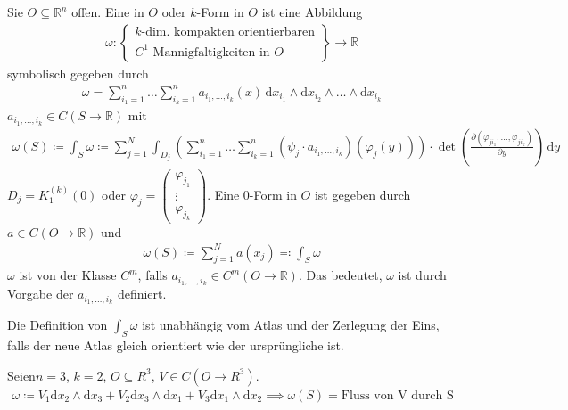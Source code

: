 \begin{theorem}[Definition] \label{thm:12.4}
  Sie $O \subseteq \mathbb{R}^n$ offen. Eine  in $O$ oder $k$-Form in $O$ ist eine Abbildung
  \begin{align*}
    \omega : \left\{
      \begin{gathered}
        \text{$k$-dim. kompakten orientierbaren} \\
        \text{$C^1$-Mannigfaltigkeiten in $O$}
      \end{gathered}
    \right\}
    \to \mathbb{R}
  \end{align*}
  symbolisch gegeben durch
  \begin{align*}
    \omega = \sum\limits_{i_1 = 1}^{n} \ldots \sum\limits_{i_k = 1}^{n} a_{i_1 ,\ldots, i_k} (x) \, \mathrm{d}x_{i_1} \wedge \mathrm{d}x_{i_2} \wedge \ldots \wedge \mathrm{d}x_{i_k}
  \end{align*}
  $a_{i_1 ,\ldots, i_k} \in C(S \to \mathbb{R})$ mit
  \begin{align*}
    \omega(S) \coloneq \int_S \omega \coloneq \sum\limits_{j=1}^{N} \int_{D_j} \left( \sum\limits_{i_1 = 1}^{n} \ldots \sum\limits_{i_k = 1}^{n} (\psi_j \cdot a_{i_1 ,\ldots, i_k})(\varphi_j(y)) \right) \cdot \det\left( \frac{\partial (\varphi_{ji_1},\ldots,\varphi_{ji_k})}{\partial y} \right) \, \mathrm{d}y
  \end{align*}
  $D_j = K_1^{(k)}(0)$ oder $\varphi_j = \left(\begin{smallmatrix} \varphi_{j_1} \\ \vdots \\ \varphi_{j_k} \end{smallmatrix}\right)$. Eine $0$-Form in $O$ ist gegeben durch $a \in C(O \to \mathbb{R})$ und
  \begin{align*}
    \omega(S) \coloneq \sum\limits_{j=1}^{N} a(x_j) \eqcolon \int_S \omega
  \end{align*}
  $\omega$ ist von der Klasse $C^m$, falls $a_{i_1 ,\ldots, i_k} \in C^m(O \to \mathbb{R})$. Das bedeutet, $\omega$ ist durch Vorgabe der $a_{i_1 ,\ldots, i_k}$ definiert.
\end{theorem}

\begin{notice} \label{thm:12.5}
  Die Definition von $\int_S \omega$ ist unabhängig vom Atlas und der Zerlegung der Eins, falls der neue Atlas gleich orientiert wie der ursprüngliche ist.
\end{notice}

\begin{example} \label{thm:12.6}
  Seien$n=3$, $k=2$, $O \subseteq R^3$, $V \in C(O \to R^3)$.
  \begin{align*}
    \omega \coloneq V_1 \mathrm{d}x_2 \wedge \mathrm{d}x_3 + V_2 \mathrm{d}x_3 \wedge \mathrm{d}x_1 + V_3 \mathrm{d}x_1 \wedge \mathrm{d}x_2 \implies \omega(S)=\text{Fluss von V durch S}
  \end{align*}
\end{example}

